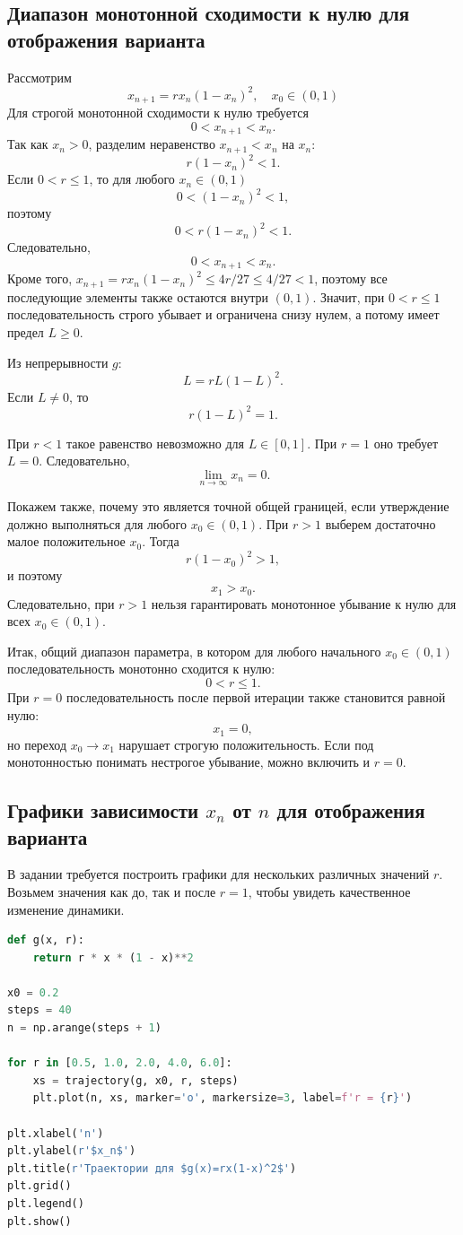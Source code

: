 \documentclass[14pt,a4paper]{extarticle}
\begin{document}
\subsection{Диапазон монотонной сходимости к нулю для отображения варианта}

Рассмотрим
\[
x_{n+1} = rx_n(1 - x_n)^2, \quad x_0 \in (0,1)
\]
Для строгой монотонной сходимости к нулю требуется
\[
0 < x_{n+1} < x_n.
\]
Так как $x_n > 0$, разделим неравенство $x_{n+1} < x_n$ на $x_n$:
\[
r(1 - x_n)^2 < 1.
\]
Если $0 < r \leq 1$, то для любого $x_n \in (0,1)$
\[
0 < (1 - x_n)^2 < 1,
\]
поэтому
\[
0 < r(1 - x_n)^2 < 1.
\]
Следовательно,
\[
0 < x_{n+1} < x_n.
\]
Кроме того, $x_{n+1} = rx_n(1 - x_n)^2 \leq 4r/27 \leq 4/27 < 1$, поэтому все последующие элементы также остаются внутри $(0,1)$. Значит, при $0 < r \leq 1$ последовательность строго убывает и ограничена снизу нулем, а потому имеет предел $L \geq 0$.

Из непрерывности $g$:
\[
L = rL(1 - L)^2.
\]
Если $L \neq 0$, то
\[
r(1 - L)^2 = 1.
\]

При $r < 1$ такое равенство невозможно для $L \in [0,1]$. При $r = 1$ оно требует $L = 0$. Следовательно,
\[
\lim_{n \rightarrow \infty} x_n = 0.
\]

Покажем также, почему это является точной общей границей, если утверждение должно выполняться для любого $x_0 \in (0,1)$. При $r > 1$ выберем достаточно малое положительное $x_0$. Тогда
\[
r(1 - x_0)^2 > 1,
\]
и поэтому
\[
x_1 > x_0.
\]
Следовательно, при $r > 1$ нельзя гарантировать монотонное убывание к нулю для всех $x_0 \in (0,1)$.

Итак, общий диапазон параметра, в котором для любого начального $x_0 \in (0,1)$ последовательность монотонно сходится к нулю:
\[
0 < r \leq 1.
\]
При $r = 0$ последовательность после первой итерации также становится равной нулю:
\[
x_1 = 0,
\]
но переход $x_0 \rightarrow x_1$ нарушает строгую положительность. Если под монотонностью понимать нестрогое убывание, можно включить и $r = 0$.


\subsection{Графики зависимости $x_n$ от $n$ для отображения варианта}

В задании требуется построить графики для нескольких различных значений $r$. Возьмем значения как до, так и после $r = 1$, чтобы увидеть качественное изменение динамики.

\begin{lstlisting}[language=python]
def g(x, r):
    return r * x * (1 - x)**2

x0 = 0.2
steps = 40
n = np.arange(steps + 1)

for r in [0.5, 1.0, 2.0, 4.0, 6.0]:
    xs = trajectory(g, x0, r, steps)
    plt.plot(n, xs, marker='o', markersize=3, label=f'r = {r}')

plt.xlabel('n')
plt.ylabel(r'$x_n$')
plt.title(r'Траектории для $g(x)=rx(1-x)^2$')
plt.grid()
plt.legend()
plt.show()
\end{lstlisting}
\end{document}
